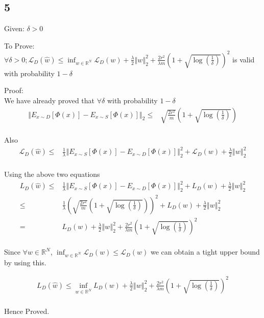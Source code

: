 \documentclass{article}
\begin{document}
\subsection*{5}
\begin{description}
  \item{Given: } $\delta > 0$ 
  \item{To Prove:} $ \forall \delta > 0; \mathcal{L}_{D}(\hat{w}) \le \inf_{w \in \mathbb{R}^{N}}\mathcal{L}_{D}(w)+\frac{\lambda}{2} \left\Vert w\right\Vert _{2}^{2}+\frac{2r^{2}}{\lambda m}{\left(1+\sqrt{\log\left(\frac{1}{\delta}\right)}\right)}^{2}$ is valid with probability $ 1 - \delta $
  \item{Proof:} \\
    We have already proved that $ \forall \delta $ with probability $ 1 - \delta $
    \begin{align*}
      {\left\Vert E_{x\sim D}\left[\Phi(x)\right]-E_{x\sim S}\left[\Phi(x)\right]\right\Vert}_{2} \leq & \sqrt{\frac{2r^{2}}{m}}\left(1+\sqrt{\log\left(\frac{1}{\delta}\right)}\right) \\
    \end{align*}

    Also 
    \begin{align*}
      \mathcal{L}_{D}(\hat{w})\leq & \frac{1}{\lambda}{\left\Vert E_{x\sim S}\left[\Phi(x)\right]-E_{x\sim D}\left[\Phi(x)\right]\right\Vert}_{2}^{2} + \mathcal{L}_{D}(w)+\frac{\lambda}{2}{\left\Vert w\right\Vert}_{2}^{2} \\
    \end{align*}

    Using the above two equations
    \begin{align*}
      L_{D}(\hat{w})\leq & \frac{1}{\lambda}\left\Vert E_{x\sim S}\left[\Phi(x)\right]-E_{x\sim D}\left[\Phi(x)\right]\right\Vert _{2}^{2}+L_{D}(w)+\frac{\lambda}{2}\left\Vert w\right\Vert _{2}^{2} \\
      \leq & \frac{1}{\lambda}{\left(\sqrt{\frac{2r^{2}}{m}}\left(1+\sqrt{\log\left(\frac{1}{\delta}\right)}\right)\right)}^{2}+L_{D}(w)+\frac{\lambda}{2}\left\Vert w\right\Vert _{2}^{2} \\
      = & L_{D}(w)+\frac{\lambda}{2}\left\Vert w\right\Vert _{2}^{2}+\frac{2r^{2}}{\lambda m}{\left(1+\sqrt{\log\left(\frac{1}{\delta}\right)}\right)}^{2} \\
    \end{align*}

    Since $ \forall w \in \mathbb{R}^{N} $,  $ \inf_{w \in \mathbb{R}^{N}}\mathcal{L}_{D}(w)\leq \mathcal{L}_{D}(w) $ we can obtain a tight upper bound by using this.

    \begin{align*}
      L_{D}(\hat{w})\leq \inf_{w\in\mathbb{R}^{N}}L_{D}(w)+\frac{\lambda}{2}\left\Vert w\right\Vert _{2}^{2}+\frac{2r^{2}}{\lambda m}{\left(1+\sqrt{\log\left(\frac{1}{\delta}\right)}\right)}^{2} \\
    \end{align*}

    Hence Proved.
\end{description}
\end{document}
